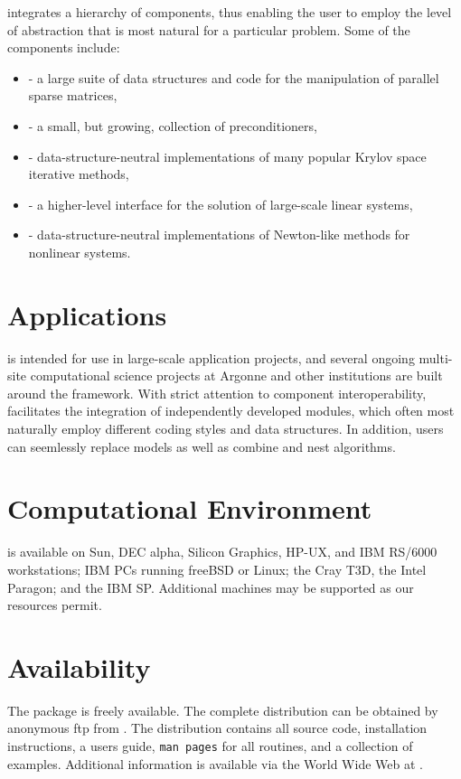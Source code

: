  integrates a hierarchy of components, thus
enabling the user to employ the level of abstraction that is most
natural for a particular problem.  Some of the components include:
\vspace{-.4cm}
\begin{itemize}
\item {} - a large suite of data structures and code
      for the manipulation of parallel sparse matrices,
\vsp
\item {} - a small, but growing, collection of preconditioners,
\vsp
\item {} - data-structure-neutral implementations of
      many popular Krylov space iterative methods,
\vsp
\item {} - a higher-level interface for the solution of
      large-scale linear systems,
\vsp
\item {} - data-structure-neutral implementations of Newton-like
      methods for nonlinear systems.
\end{itemize}
\vspace{-.3cm}

\section*{Applications}
 is intended for use in large-scale application projects, and
several ongoing multi-site computational science projects at Argonne and
other institutions are built around the  framework.
With strict attention to component interoperability, 
facilitates the integration of independently developed modules, which
often most naturally employ different coding styles and data
structures.  In addition, users can seemlessly replace models as well
as combine and nest algorithms.

\section*{Computational Environment}
 is available on Sun, DEC alpha, Silicon Graphics, HP-UX, and IBM
RS/6000 workstations; IBM PCs running freeBSD or Linux; the Cray T3D,
the Intel Paragon; and the IBM SP. Additional machines may be supported as our
resources permit.

\section*{Availability}

The  package is freely available.
The complete distribution can be obtained by anonymous ftp from 
.
The  distribution contains all source code, installation
instructions, a users guide, {\tt man pages} for all routines, and a
collection of examples.  Additional information is available via the
World Wide Web at
.

\vspace{-.1cm}
\makeinfo

